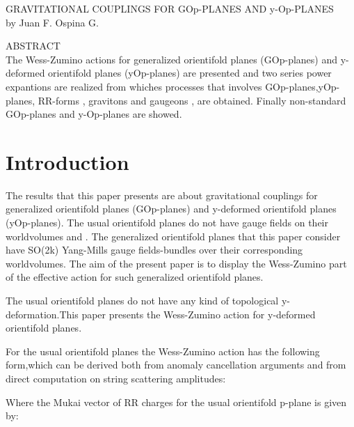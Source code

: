 \documentclass[a4paper,a4paper]{article}
\begin{document}
\begin{center}
GRAVITATIONAL COUPLINGS FOR GOp-PLANES AND y-Op-PLANES \\ [.25in]
by Juan F. Ospina G.
\end{center}
\begin{center}
ABSTRACT \\ [.25in]
The Wess-Zumino actions for generalized orientifold planes (GOp-planes) and y-deformed orientifold planes (yOp-planes) are presented and two series power expantions are realized from whiches processes that involves GOp-planes,yOp-planes, RR-forms , gravitons and gaugeons , are obtained. Finally non-standard GOp-planes and y-Op-planes are showed.
\end{center}

\section{Introduction}
The results that this paper presents are about gravitational couplings for generalized orientifold planes (GOp-planes) and y-deformed orientifold planes (yOp-planes). The usual orientifold planes do not have gauge fields on their worldvolumes and  . The generalized orientifold planes that this paper consider have SO(2k) Yang-Mills gauge fields-bundles over their corresponding worldvolumes. The aim of the present paper is to display the Wess-Zumino part of the effective action for such generalized orientifold planes.

The usual orientifold planes do not have any kind of topological y-deformation.This paper presents the Wess-Zumino action for  y-deformed orientifold planes.

For the usual orientifold planes the Wess-Zumino action has the following form,which can be derived both from anomaly cancellation arguments and from
direct computation on string scattering amplitudes:   

\begin{center}
{  \coordHE{} }
\end{center}

Where the Mukai vector of RR charges for the usual orientifold p-plane is given by:
\end{document}

